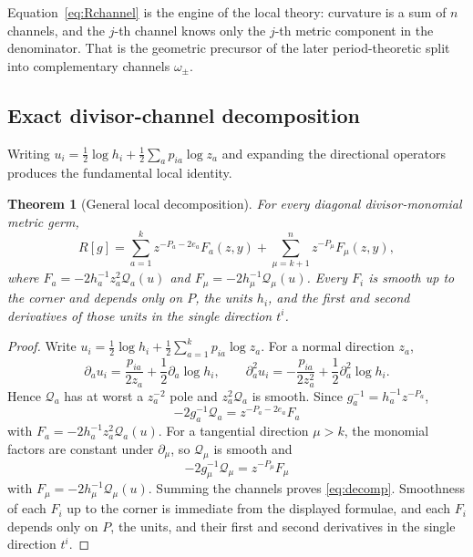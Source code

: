 \documentclass[11pt,a4paper]{article}
\newtheorem{theorem}{Theorem}[section]
\theoremstyle{definition}
\theoremstyle{remark}
\begin{document}
Equation~\eqref{eq:Rchannel} is the engine of the local theory: curvature is a
sum of \(n\) channels, and the \(j\)-th channel knows only the \(j\)-th metric
component in the denominator. That is the geometric precursor of the later
period-theoretic split into complementary channels \(\omega_\pm\).

\subsection{Exact divisor-channel decomposition}

Writing \(u_i=\tfrac12\log h_i+\tfrac12\sum_ap_{ia}\log z_a\) and expanding the
directional operators produces the fundamental local identity.

\begin{theorem}[General local decomposition]
\label{thm:localdecomp}
For every diagonal divisor-monomial metric germ,
\begin{equation}
\boxed{
R[g]
=
\sum_{a=1}^{k}z^{-P_a-2e_a}F_a(z,y)
+
\sum_{\mu=k+1}^{n}z^{-P_\mu}F_\mu(z,y),
}
\label{eq:decomp}
\end{equation}
where \(F_a=-2h_a^{-1}z_a^2\mathcal Q_a(u)\) and
\(F_\mu=-2h_\mu^{-1}\mathcal Q_\mu(u)\). Every \(F_i\) is smooth up to the
corner and depends only on \(P\), the units \(h_i\), and the first and second
derivatives of those units in the single direction \(t^i\).
\end{theorem}

\begin{proof}
Write
\(u_i=\tfrac12\log h_i+\tfrac12\sum_{a=1}^{k}p_{ia}\log z_a\).
For a normal direction \(z_a\),
\[
\partial_au_i
=
\frac{p_{ia}}{2z_a}+\frac12\partial_a\log h_i,
\qquad
\partial_a^2u_i
=
-\frac{p_{ia}}{2z_a^2}+\frac12\partial_a^2\log h_i.
\]
Hence \(\mathcal Q_a\) has at worst a \(z_a^{-2}\) pole and \(z_a^2\mathcal Q_a\) is
smooth. Since \(g_a^{-1}=h_a^{-1}z^{-P_a}\),
\[
-2g_a^{-1}\mathcal Q_a=z^{-P_a-2e_a}F_a
\]
with \(F_a=-2h_a^{-1}z_a^2\mathcal Q_a(u)\). For a tangential direction
\(\mu>k\), the monomial factors are constant under \(\partial_\mu\), so
\(\mathcal Q_\mu\) is smooth and
\[
-2g_\mu^{-1}\mathcal Q_\mu=z^{-P_\mu}F_\mu
\]
with \(F_\mu=-2h_\mu^{-1}\mathcal Q_\mu(u)\). Summing the channels proves
\eqref{eq:decomp}. Smoothness of each \(F_i\) up to the corner is immediate from
the displayed formulae, and each \(F_i\) depends only on \(P\), the units, and
their first and second derivatives in the single direction \(t^i\).
\end{proof}
\end{document}
